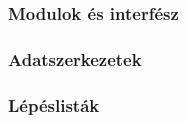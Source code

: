 \subsubsection{Modulok és interfész}

\subsubsection{Adatszerkezetek}

\subsubsection{Lépéslisták}

